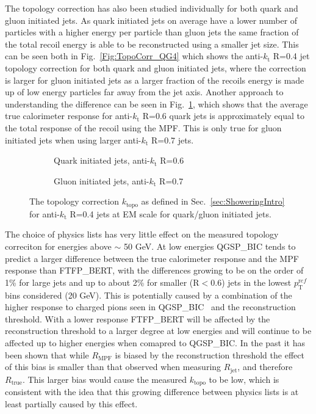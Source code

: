 The topology correction has also been studied individually for both quark and gluon initiated jets.
As quark initiated jets on average have a lower number of particles with a higher energy per particle than gluon jets the same fraction of the total recoil energy is able to be reconstructed using a smaller jet size.  
This can be seen both in Fig.~\ref{Fig:TopoCorr_QG4} which shows the anti-$k_\mathrm{t}$ R=0.4 jet topology correction for both quark and gluon initiated jets, where the correction is larger for gluon initiated jets as a larger fraction of the recoils energy is made up of low energy particles far away from the jet axis.  
Another approach to understanding the difference can be seen in Fig.~\ref{Fig:TopoCorr_QGSizes}, which shows that the average true calorimeter response for anti-$k_\mathrm{t}$ R=0.6 quark jets is approximately equal to the total response of the recoil using the MPF.  
This is only true for gluon initiated jets when using larger anti-$k_\mathrm{t}$ R=0.7 jets.  

\begin{figure}[!ht]
  \centering
  \begin{subfigure}{.5\textwidth}
    \centering
    \caption{Quark initiated jets, anti-$k_\mathrm{t}$ R=0.6}
  \end{subfigure}%
  \begin{subfigure}{.5\textwidth}  \centering
    \caption{Gluon initiated jets, anti-$k_\mathrm{t}$ R=0.7}
  \end{subfigure}
  \caption[Topology correction for quark/gluon initiated jets.]
{\small The topology correction $k_{\mathrm{topo}}$ as defined in Sec.~\ref{sec:ShoweringIntro} for anti-$k_\mathrm{t}$ R=0.4 jets at EM scale for quark/gluon initiated jets.  }
  \label{Fig:TopoCorr_QGSizes}
\end{figure}

The choice of physics lists has very little effect on the measured topology correciton for energies above $\sim$ 50 GeV.  
At low energies QGSP\_BIC tends to predict a larger difference between the true calorimeter response and the MPF response than FTFP\_BERT, with the differences growing to be on the order of 1\% for large jets and up to about 2\% for smaller (R$<$0.6) jets in the lowest $p_{\mathrm T}^{\mathrm ref}$ bins considered (20 GeV).  
This is potentially caused by a combination of the higher response to charged pions seen in QGSP\_BIC~\cite{Zhang:2253040} and the reconstruction threshold.  
With a lower response FTFP\_BERT will be affected by the reconstruction threshold to a larger degree at low energies and will continue to be affected up to higher energies when comapred to QGSP\_BIC.  
In the past it has been shown that while $R_{\mathrm{MPF}}$ is biased by the reconstruction threshold the effect of this bias is smaller than that observed when measuring $R_{\mathrm{jet}}$, and therefore $R_{\mathrm{true}}$. 
This larger bias would cause the measured $k_{\mathrm{topo}}$ to be low, which is consistent with the idea that this growing difference between physics lists is at least partially caused by this effect.  


